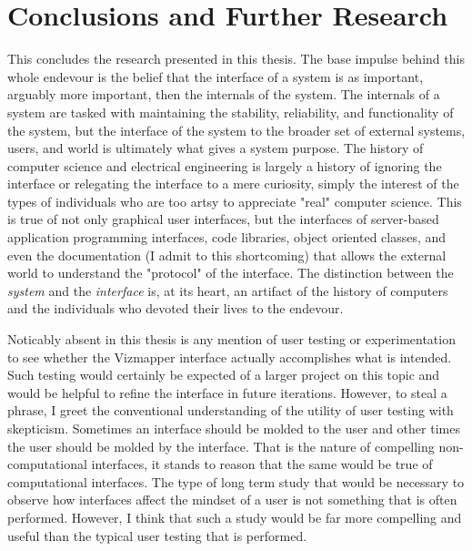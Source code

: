 \resetdatestamp

\chapter{Conclusions and Further Research}

This concludes the research presented in this thesis. The base impulse behind this whole endevour is the belief that the interface of a system is as important, arguably more important, then the internals of the system. The internals of a system are tasked with maintaining the stability, reliability, and functionality of the system, but the interface of the system to the broader set of external systems, users, and world is ultimately what gives a system purpose. The history of computer science and electrical engineering is largely a history of ignoring the interface or relegating the interface to a mere curiosity, simply the interest of the types of individuals who are too artsy to appreciate "real" computer science. This is true of not only graphical user interfaces, but the interfaces of server-based application programming interfaces, code libraries, object oriented classes, and even the documentation (I admit to this shortcoming) that allows the external world to understand the "protocol" of the interface. The distinction between the \emph{system} and the \emph{interface} is, at its heart, an artifact of the history of computers and the individuals who devoted their lives to the endevour.

Noticably absent in this thesis is any mention of user testing or experimentation to see whether the Vizmapper interface actually accomplishes what is intended. Such testing would certainly be expected of a larger project on this topic and would be helpful to refine the interface in future iterations. However, to steal a phrase, I greet the conventional understanding of the utility of user testing with skepticism. Sometimes an interface should be molded to the user and other times the user should be molded by the interface. That is the nature of compelling non-computational interfaces, it stands to reason that the same would be true of computational interfaces. The type of long term study that would be necessary to observe how interfaces affect the mindset of a user is not something that is often performed. However, I think that such a study would be far more compelling and useful than the typical user testing that is performed.
